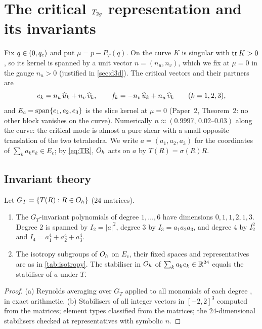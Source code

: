 \section{The critical $T_{2g}$ representation and its invariants}\label{sec:t2g}

Fix $q\in(0,q_{c})$ and put $\mu=p-P_T(q)$. On the curve $K$ is singular with $\operatorname{tr} K>0$, so its kernel is spanned by a
unit vector $n=(n_u,n_v)$, which we fix at $\mu=0$ in the gauge $n_u>0$ (justified in \cref{sec:d3d}). The critical
vectors and their partners are
\begin{equation}\label{eq:ek}
e_k=n_u\,\widehat{u}_k+n_v\,\widehat{v}_k,\qquad f_k=-n_v\,\widehat{u}_k+n_u\,\widehat{v}_k\qquad(k=1,2,3),
\end{equation}
and $E_c=\operatorname{span}\{e_1,e_2,e_3\}$ is the slice kernel at $\mu=0$ (Paper~2, Theorem~2: no other block vanishes on the
curve). Numerically $n\approx(0.9997,\,0.02\text{--}0.03)$ along the curve: the critical mode is almost a pure shear with
a small opposite translation of the two tetrahedra. We write $a=(a_1,a_2,a_3)$ for the coordinates of
$\sum_ka_ke_k\in E_c$; by \eqref{eq:TR}, $O_{h}$ acts on $a$ by $T(R)=\sigma(R)R$.

\subsection{Invariant theory}

\begin{lemma}\label{lem:invariants}
Let $G_T=\{T(R):R\in O_{h}\}$ ($24$ matrices).
\begin{enumerate}[label=(\alph*)]
\item The $G_T$-invariant polynomials of degree $1,\dots,6$ have dimensions $0,1,1,2,1,3$. Degree $2$ is spanned by
$I_2=|a|^2$, degree $3$ by $I_3=a_1a_2a_3$, and degree $4$ by $I_2^2$ and $I_4=a_1^4+a_2^4+a_3^4$.
\item The isotropy subgroups of $O_{h}$ on $E_c$, their fixed spaces and representatives are as in \cref{tab:isotropy}. The
stabiliser in $O_{h}$ of $\sum_ka_ke_k\in\mathbb{R}^{24}$ equals the stabiliser of $a$ under $T$.
\end{enumerate}
\end{lemma}
\begin{proof}
(a) Reynolds averaging over $G_T$ applied to all monomials of each degree \citep{Sturmfels2008}, in exact arithmetic.
(b) Stabilisers of all integer vectors in $[-2,2]^3$ computed from the matrices; element types classified from
the matrices; the $24$-dimensional stabilisers checked at representatives with symbolic $n$.
\end{proof}

